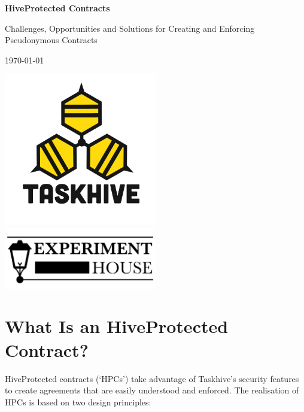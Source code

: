 \documentclass[a4paper,12pt]{article}
\begin{document}
\vspace*{\fill}

\begin{titlebox}
\begin{center}
\Huge{\textbf{HiveProtected Contracts}}

\vspace{1em}

\large{Challenges, Opportunities and Solutions for Creating and Enforcing Pseudonymous Contracts}

\vspace{1em}

\large{\today}
\end{center}
\end{titlebox}

\vfill

\begin{center}
\includegraphics[width=0.5\textwidth]{TH.png}\\
\includegraphics[width=0.5\textwidth]{EH.png}
\end{center}

\newpage

\setcounter{tocdepth}{2}

\tableofcontents

\section{What Is an HiveProtected Contract?}

HiveProtected contracts (`HPCs') take advantage of Taskhive's security features to create agreements that are easily understood and enforced. The realisation of HPCs is based on two design principles:
\end{document}
